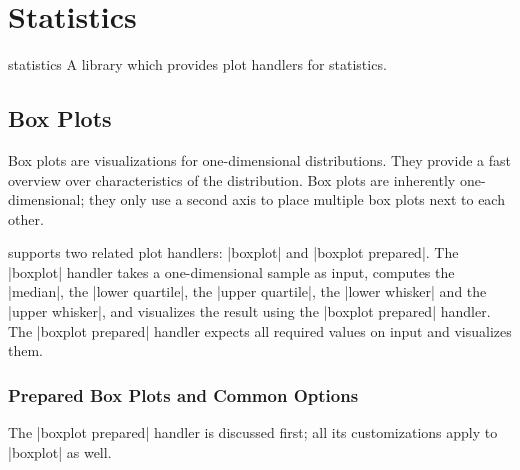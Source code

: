 
\section{Statistics}

\begingroup
\def\pgfplotsmanualcurlibrary{statistics}

\begin{pgfplotslibrary}{statistics}
    A library which provides plot handlers for statistics.
\end{pgfplotslibrary}


\subsection{Box Plots}
\label{sec:boxplots}

\begingroup

\oldgraykeyprefixes
{}%

Box plots are visualizations for one-dimensional distributions. They provide a
fast overview over characteristics of the distribution. Box plots are
inherently one-dimensional; they only use a second axis to place multiple box
plots next to each other.

\PGFPlots{} supports two related plot handlers: |boxplot| and
|boxplot prepared|. The |boxplot| handler takes a one-dimensional sample as
input, computes the |median|, the |lower quartile|, the |upper quartile|, the
|lower whisker| and the |upper whisker|, and visualizes the result using the
|boxplot prepared| handler. The |boxplot prepared| handler expects all required
values on input and visualizes them.


\subsubsection{Prepared Box Plots and Common Options}

The |boxplot prepared| handler is discussed first; all its customizations apply
to |boxplot| as well.

